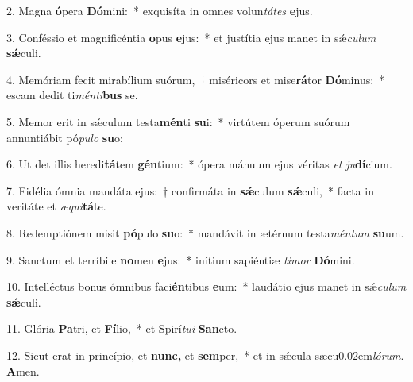 \item 2. Magna \textbf{ó}pera \textbf{Dó}mini:~* exquisíta in omnes volun\textit{tátes} \textbf{e}jus.
\item 3. Conféssio et magnificéntia \textbf{o}pus \textbf{e}jus:~* et justítia ejus manet in sǽ\textit{culum} \textbf{sǽ}culi.
\item 4. Memóriam fecit mirabílium suórum,~† miséricors et mise\textbf{rá}tor \textbf{Dó}minus:~* escam dedit ti\textit{ménti}\textbf{bus} se.
\item 5. Memor erit in sǽculum testa\textbf{mén}ti \textbf{su}i:~* virtútem óperum suórum annuntiábit pó\textit{pulo} \textbf{su}o:
\item 6. Ut det illis heredi\textbf{tá}tem \textbf{gén}tium:~* ópera mánuum ejus véritas \textit{et} \textit{ju}\textbf{dí}cium.
\item 7. Fidélia ómnia mandáta ejus:~† confirmáta in \textbf{sǽ}culum \textbf{sǽ}culi,~* facta in veritáte et \textit{æqui}\textbf{tá}te.
\item 8. Redemptiónem misit \textbf{pó}pulo \textbf{su}o:~* mandávit in ætérnum testa\textit{méntum} \textbf{su}um.
\item 9. Sanctum et terríbile \textbf{no}men \textbf{e}jus:~* inítium sapiéntiæ \textit{timor} \textbf{Dó}mini.
\item 10. Intelléctus bonus ómnibus faci\textbf{én}tibus \textbf{e}um:~* laudátio ejus manet in sǽ\textit{culum} \textbf{sǽ}culi.
\item 11. Glória \textbf{Pa}tri, et \textbf{Fí}lio,~* et Spirí\textit{tui} \textbf{San}cto.
\item 12. Sicut erat in princípio, et \textbf{nunc,} et \textbf{sem}per,~* et in sǽcula sæcu\kern0.02em\textit{lórum}. \textbf{A}men.